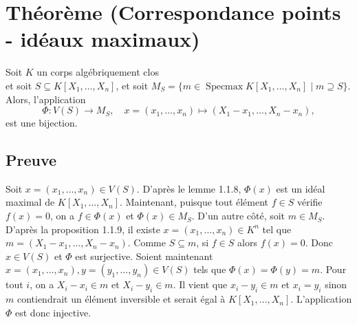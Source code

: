 \documentclass[12pt]{book}
\begin{document}
\section {Théorème  (Correspondance points - idéaux maximaux)} Soit \( K \) un corps algébriquement clos \\et soit \( S \subseteq K[X_1, \dots, X_n] \), et soit \( M_S = \{ m \in \operatorname{Specmax} K[X_1, \dots, X_n] \mid m \supseteq S \} \). Alors, l'application \[ \Phi : V(S) \to M_S, \quad x = (x_1, \dots, x_n) \mapsto (X_1 - x_1, \dots, X_n - x_n), \] est une bijection. 
\subsection*{Preuve} Soit \( x = (x_1, \dots, x_n) \in V(S) \). D'après le lemme 1.1.8, \( \Phi(x) \) est un idéal maximal de \( K[X_1, \dots, X_n] \). Maintenant, puisque tout élément \( f \in S \) vérifie \( f(x) = 0 \), on a \( f \in \Phi(x) \) et \( \Phi(x) \in M_S \). D’un autre côté, soit \( m \in M_S \). D’après la proposition 1.1.9, il existe \( x = (x_1, \dots, x_n) \in K^n \) tel que \( m = (X_1 - x_1, \dots, X_n - x_n) \). Comme \( S \subseteq m \), si \( f \in S \) alors \( f(x) = 0 \). Donc \( x \in V(S) \) et \( \Phi \) est surjective. Soient maintenant \( x = (x_1, \dots, x_n), y = (y_1, \dots, y_n) \in V(S) \) tels que \( \Phi(x) = \Phi(y) = m \). Pour tout \( i \), on a \( X_i - x_i \in m \) et \( X_i - y_i \in m \). Il vient que \( x_i - y_i \in m \) et \( x_i = y_i \) sinon \( m \) contiendrait un élément inversible et serait égal à \( K[X_1, \dots, X_n] \). L’application \( \Phi \) est donc injective.
\end{document}
